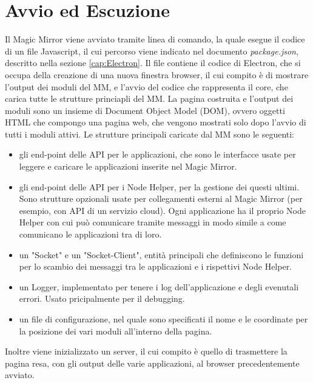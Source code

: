 \section{Avvio ed Escuzione}
Il Magic Mirror viene avviato tramite linea di comando, la quale esegue
il codice di un file Javascript, il cui percorso viene indicato nel documento \textit{package.json}, descritto nella sezione \ref{cap:Electron}.
Il file contiene il codice di Electron, che si occupa della creazione di una nuova finestra browser, il cui compito
è di mostrare l'output dei moduli del MM, e l'avvio del codice che rappresenta il core, che carica tutte le strutture princiapli del MM.
La pagina costruita e l'output dei moduli sono un insieme di Document Object Model (DOM), ovvero oggetti HTML che compongo una pagina web, che vengono mostrati solo dopo l'avvio di tutti i moduli attivi.
Le strutture principali caricate dal MM sono le seguenti:
\begin{itemize}
\item gli end-point delle API per le applicazioni, che sono le interfacce usate per leggere e caricare le applicazioni inserite nel Magic Mirror.
\item gli end-point delle API per i Node Helper, per la gestione dei questi ultimi. Sono strutture opzionali usate per collegamenti
esterni al Magic Mirror (per esempio, con API di un servizio cloud). Ogni applicazione ha il proprio Node Helper con cui pu\`o comunicare tramite messaggi in modo
simile a come comunicano le applicazioni tra di loro.
\item un "Socket" e un "Socket-Client", entit\`a principali che definiscono le funzioni per lo scambio dei messaggi tra le applicazioni e i rispettivi Node Helper.
\item un Logger, implementato per tenere i log dell'applicazione e degli evenutali errori. Usato pricipalmente per il debugging.
\item un file di configurazione, nel quale sono specificati il nome e le coordinate per la posizione dei vari moduli
all'interno della pagina.\\[2\baselineskip]
\end{itemize}
Inoltre viene inizializzato un server, il cui compito \`e quello di trasmettere la pagina resa, con gli output delle varie applicazioni,
al browser precedentemente avviato.


